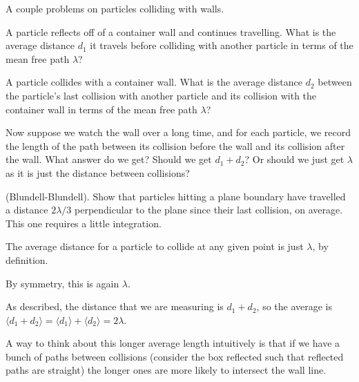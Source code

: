 \documentclass[11pt]{scrartcl}
\begin{document}
\begin{prob}
    A couple problems on particles colliding with walls.
    \begin{anum}
        \item A particle reflects off of a container wall and continues travelling. What is the average distance $d_1$ it travels before colliding with another particle in terms of the mean free path $\lambda$?
        \item A particle collides with a container wall. What is the average distance $d_2$ between the particle's last collision with another particle and its collision with the container wall in terms of the mean free path $\lambda$?
        \item Now suppose we watch the wall over a long time, and for each particle, we record the length of the path between its collision before the wall and its collision after the wall. What answer do we get? Should we get $d_1 + d_2$? Or should we just get $\lambda$ as it is just the distance between collisions?
        \item (Blundell-Blundell). Show that particles hitting a plane boundary have
travelled a distance $2\lambda / 3$ perpendicular to the plane
since their last collision, on average. This one requires a little integration.
    \end{anum}
\end{prob}
\begin{alphasol}
    \item The average distance for a particle to collide at any given point is just $\lambda$, by definition.
    \item By symmetry, this is again $\lambda$.
    \item As described, the distance that we are measuring is $d_1 + d_2$, so the average is $\langle d_1 + d_2\rangle = \langle d_1 \rangle + \langle d_2 \rangle = 2\lambda$.

    A way to think about this longer average length intuitively is that if we have a bunch of paths between collisions (consider the box reflected such that reflected paths are straight) the longer ones are more likely to intersect the wall line.
\end{alphasol}
\end{document}
